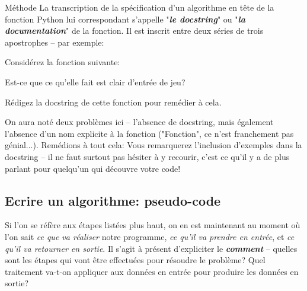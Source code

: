 \documentclass[12pt]{article}
\begin{document}
	\begin{MonAmp}{Méthode}
		La transcription de la spécification d'un algorithme en tête de la fonction Python lui correspondant s'appelle "\textit{\textbf{le docstring}}" ou "\textit{\textbf{la documentation}}" de la fonction. Il est inscrit entre deux séries de trois apostrophes -- par exemple:
	\end{MonAmp}
	
		\begin{MonExo}
		Considérez la fonction suivante:
		
		Est-ce que ce qu'elle fait est clair d'entrée de jeu? 
		
		Rédigez la docstring de cette fonction pour remédier à cela.
	\end{MonExo}
	
	\begin{MaReponse}
		On aura noté deux problèmes ici -- l'absence de docstring, mais également l'absence d'un nom explicite à la fonction ("Fonction", ce n'est franchement pas génial...). Remédions à tout cela:
		Vous remarquerez l'inclusion d'exemples dans la docstring -- il ne faut surtout pas hésiter à y recourir, c'est ce qu'il y a de plus parlant pour quelqu'un qui découvre votre code!
	\end{MaReponse}
	
	\subsection{Ecrire un algorithme: pseudo-code}

	Si l'on se réfère aux étapes listées plus haut, on en est maintenant au moment où l'on sait \textit{ce que va réaliser} notre programme, \textit{ce qu'il va prendre en entrée}, et \textit{ce qu'il va retourner en sortie}. Il s'agit à présent d'expliciter le \textit{\textbf{comment}} -- quelles sont les étapes qui vont être effectuées pour résoudre le problème? Quel traitement va-t-on appliquer aux données en entrée pour produire les données en sortie?
	
\end{document}
